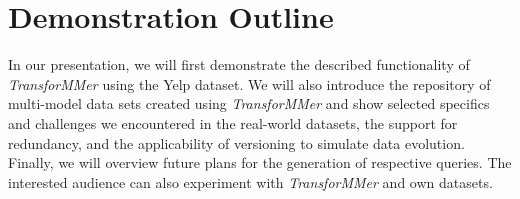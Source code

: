 \section{Demonstration Outline}
In our presentation, we will first demonstrate the described functionality of \textit{TransforMMer} using the Yelp dataset. We will also introduce the repository of multi-model data sets created using \textit{TransforMMer} and show selected specifics and challenges we encountered in the real-world datasets, the support for redundancy, and the applicability of versioning to simulate data evolution. Finally, we will overview future plans for the generation of respective queries. The interested audience can also experiment with \textit{TransforMMer} and own datasets.

